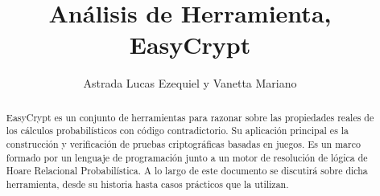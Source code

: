 \documentclass[runningheads,a4paper]{llncs}
\begin{document}
\mainmatter  %

\title{Análisis de Herramienta, EasyCrypt}


%
%
\author
{
Astrada Lucas Ezequiel
y
Vanetta Mariano
}
%


%
%

\maketitle


\begin{abstract}    
EasyCrypt es un conjunto de herramientas para razonar sobre las propiedades reales de los cálculos probabilísticos con código contradictorio. Su aplicación principal es la construcción y verificación de pruebas criptográficas basadas en juegos. 
Es un marco formado por un lenguaje de programación junto a un motor de resolución de lógica de Hoare Relacional Probabilística. A lo largo de este documento se discutirá sobre dicha herramienta, desde su historia hasta casos prácticos que la utilizan.
\cite{article1}


\end{abstract}
\end{document}
